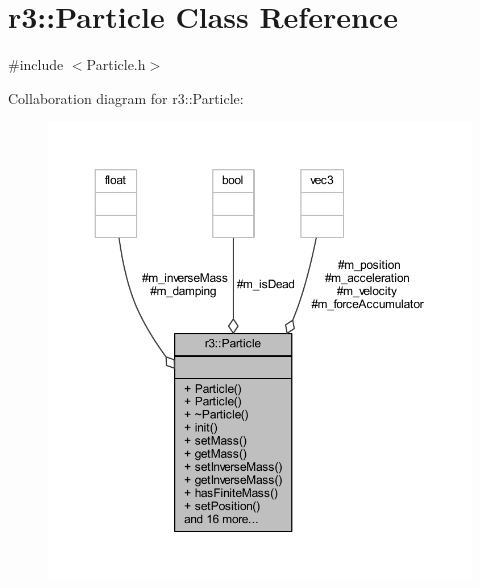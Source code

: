 \hypertarget{classr3_1_1_particle}{}\section{r3\+:\+:Particle Class Reference}
\label{classr3_1_1_particle}


{\ttfamily \#include $<$Particle.\+h$>$}



Collaboration diagram for r3\+:\+:Particle\+:\nopagebreak
\begin{figure}[H]
\begin{center}
\leavevmode
\includegraphics[width=350pt]{classr3_1_1_particle__coll__graph}
\end{center}
\end{figure}

